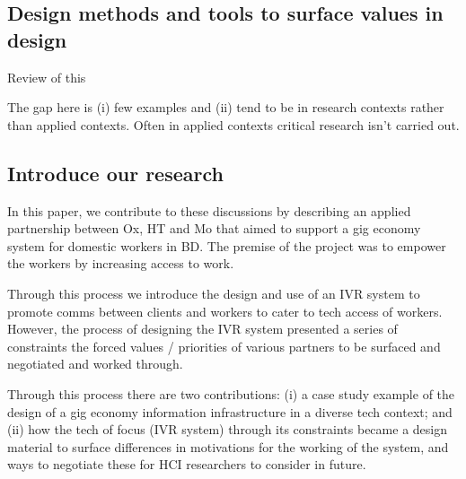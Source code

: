\subsection{Design methods and tools to surface values in design }

Review of this

The gap here is (i) few examples and (ii) tend to be in research contexts rather than applied contexts. Often in applied contexts critical research isn’t carried out. 

\subsection{Introduce our research}

In this paper, we contribute to these discussions by describing an applied partnership between Ox, HT and Mo that aimed to support a gig economy system for domestic workers in BD. The premise of the project was to empower the workers by increasing access to work.

Through this process we introduce the design and use of an IVR system to promote comms between clients and workers to cater to tech access of workers. However, the process of designing the IVR system presented a series of constraints the forced values / priorities of various partners to be surfaced and negotiated and worked through. 

Through this process there are two contributions: (i) a case study example of the design of a gig economy information infrastructure in a diverse tech context; and (ii) how the tech of focus (IVR system) through its constraints became a design material to surface differences in motivations for the working of the system, and ways to negotiate these for HCI researchers to consider in future.  
